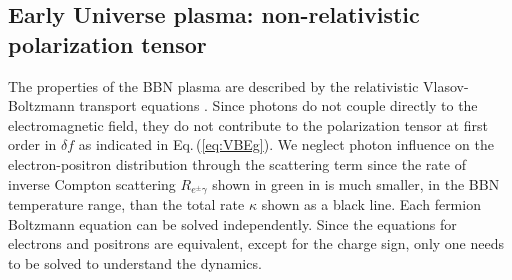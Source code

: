 

 




\subsection{Early Universe plasma: non-relativistic polarization tensor}\label{sec:kinetic_theory}
The properties of the BBN plasma are described by the relativistic Vlasov-Boltzmann transport equations . Since photons do not couple directly to the electromagnetic field, they do not contribute to the polarization tensor at first order in $\delta f$ as indicated in Eq.\,(\ref{eq:VBEg}). We neglect photon influence on the electron-positron distribution through the scattering term since the rate of inverse Compton scattering $R_{e^{\pm}\gamma }$ shown in green in  is much smaller, in the BBN temperature range, than the total rate $\kappa$ shown as a black line. Each fermion Boltzmann equation  can be solved independently. Since the equations for electrons and positrons are equivalent, except for the charge sign, only one needs to be solved to understand the dynamics.

